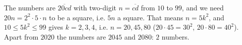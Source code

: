 The numbers are $\overline{20cd}$ with two-digit $n=\overline{cd}$ from $10$ to $99$, and we need $20n=2^2\cdot5\cdot n$ to be a square, i.e. $5n$ a square. That means $n=5k^2$, and $10\le5k^2\le99$ gives $k=2,3,4$, i.e. $n=20,45,80$ ($20\cdot45=30^2$, $20\cdot80=40^2$). Apart from $2020$ the numbers are $2045$ and $2080$: $\boxed{2}$ numbers.
